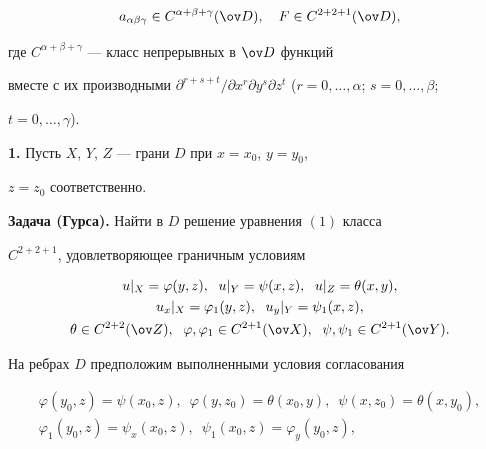 \begin{equation} 


a_{\alpha\beta\gamma}\in C^{\alpha+\beta+\gamma}(\ov D),\quad 


F\in C^{2+2+1}(\ov D), 


\end{equation} 


где $C^{\alpha+\beta+\gamma}$ --- класс непрерывных в $\ov D$ функций 


вместе с их производными $\partial^{r+s+t}/ \partial x^r \partial y^s 


\partial z^t$ ($r=0,\dotsc,\alpha$; $s=0,\dotsc,\beta$; 


$t=0,\dotsc,\gamma$). 


 


{\bf 1.} Пусть $X$, $Y$, $Z$ --- грани $D$ при $x=x_0$, $y=y_0$, 


$z=z_0$ соответственно. 


\medskip 


 


{\bf Задача (Гурса).} Найти в $D$ решение уравнения $(1)$ класса 


$C^{2+2+1}$, удовлетворяющее граничным условиям


\begin{gather} 


u|_X=\varphi(y,z),\ \; u|_Y=\psi(x,z),\ \; u|_Z=\theta(x,y),\notag\\ 


u_x|_X=\varphi_1(y,z),\ \; u_y|_Y=\psi_1(x,z),\\ 


\theta\in C^{2+2}(\ov Z),\ \; \varphi,\varphi_1\in C^{2+1}(\ov X), 


\ \; \psi,\psi_1\in C^{2+1}(\ov Y).\notag 


\end{gather} 


 


На ребрах $D$ предположим выполненными условия согласования 


\begin{gather*} 


\varphi(y_0,z)=\psi(x_0,z),\ \; 


\varphi(y,z_0)=\theta(x_0,y),\ \; 


\psi(x,z_0)=\theta(x,y_0),\\ 


\varphi_1(y_0,z)=\psi_x(x_0,z),\ \; 


\psi_1(x_0,z)=\varphi_y(y_0,z), 


\end{gather*} 


